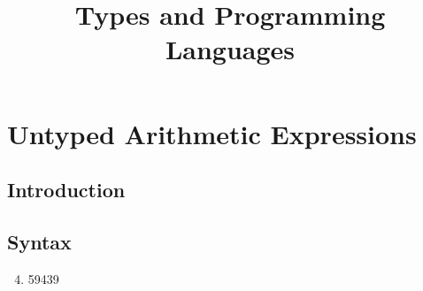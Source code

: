 \documentclass{article}
\title{Types and Programming Languages}
\author{}
\date{}
\begin{document}
\maketitle
\setcounter{section}{2}
\section{Untyped Arithmetic Expressions}
\subsection{Introduction}
\subsection{Syntax}
\begin{enumerate}[label=3.2.\arabic*]
	\setcounter{enumi}{3}
	\item 59439
\end{enumerate}
\end{document}
